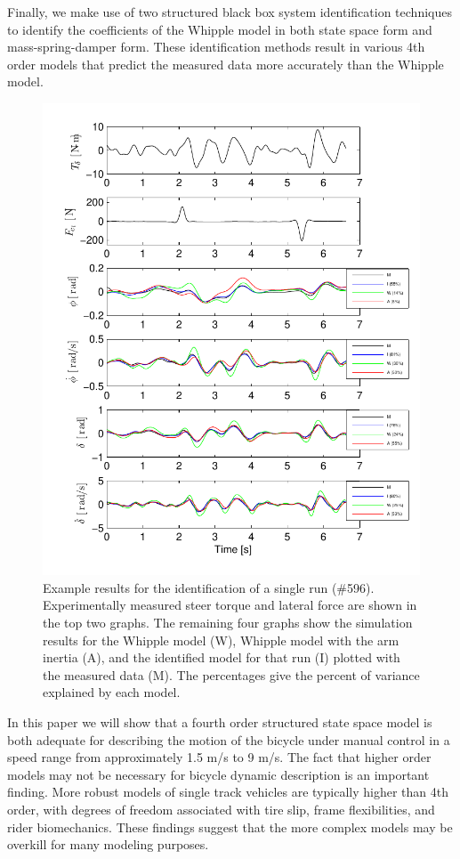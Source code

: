 \documentclass[a4paper]{article}
\begin{document}
Finally, we make use of two structured black box system identification
techniques to identify the coefficients of the Whipple model in both state
space form and mass-spring-damper form. These identification methods result in
various 4th order models that predict the measured data more accurately than
the Whipple model.

\begin{figure}
  \centering
  \includegraphics[width=5.0in]{example-fit.pdf}
  \caption{Example results for the identification of a single run (\#596).
    Experimentally measured steer torque and lateral force are shown in the top
    two graphs. The remaining four graphs show the simulation results for the
    Whipple model (W), Whipple model with the arm inertia (A), and the
    identified model for that run (I) plotted with the measured data (M). The
  percentages give the percent of variance explained by each model.}
\end{figure}

In this paper we will show that a fourth order structured state space model is
both adequate for describing the motion of the bicycle under manual control in
a speed range from approximately 1.5 m/s to 9 m/s. The fact that higher order
models may not be necessary for bicycle dynamic description is an important
finding. More robust models of single track vehicles are typically higher than
4th order, with degrees of freedom associated with tire slip, frame
flexibilities, and rider biomechanics. These findings suggest that the more
complex models may be overkill for many modeling purposes.
\end{document}
